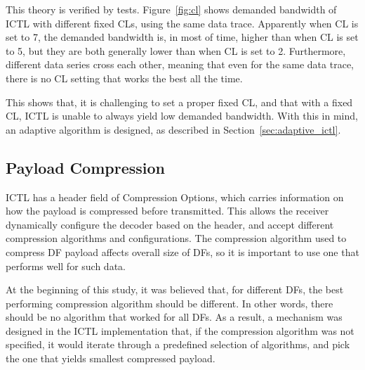 \documentclass[12pt]{report}
\begin{document}
This theory is verified by tests. Figure~\ref{fig:cl} shows demanded bandwidth of ICTL with different fixed CLs, using the same data trace. Apparently when CL is set to 7, the demanded bandwidth is, in most of time, higher than when CL is set to 5, but they are both generally lower than when CL is set to 2. Furthermore, different data series cross each other, meaning that even for the same data trace, there is no CL setting that works the best all the time.

This shows that, it is challenging to set a proper fixed CL, and that with a fixed CL, ICTL is unable to always yield low demanded bandwidth. With this in mind, an adaptive algorithm is designed, as described in Section~\ref{sec:adaptive_ictl}.

\subsection{Payload Compression}
\label{sec:payload_compression}

ICTL has a header field of Compression Options, which carries information on how the payload is compressed before transmitted. This allows the receiver dynamically configure the decoder based on the header, and accept different compression algorithms and configurations. The compression algorithm used to compress DF payload affects overall size of DFs, so it is important to use one that performs well for such data.

At the beginning of this study, it was believed that, for different DFs, the best performing compression algorithm should be different. In other words, there should be no algorithm that worked for all DFs. As a result, a mechanism was designed in the ICTL implementation that, if the compression algorithm was not specified, it would iterate through a predefined selection of algorithms, and pick the one that yields smallest compressed payload.
\end{document}
